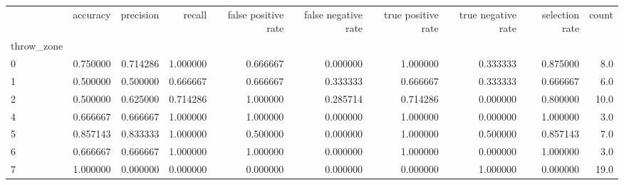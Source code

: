 \begin{tabular}{lrrrrrrrrr}
\toprule
{} &  accuracy &  precision &    recall &  false positive rate &  false negative rate &  true positive rate &  true negative rate &  selection rate &  count \\
throw\_zone &           &            &           &                      &                      &                     &                     &                 &        \\
\midrule
0          &  0.750000 &   0.714286 &  1.000000 &             0.666667 &             0.000000 &            1.000000 &            0.333333 &        0.875000 &    8.0 \\
1          &  0.500000 &   0.500000 &  0.666667 &             0.666667 &             0.333333 &            0.666667 &            0.333333 &        0.666667 &    6.0 \\
2          &  0.500000 &   0.625000 &  0.714286 &             1.000000 &             0.285714 &            0.714286 &            0.000000 &        0.800000 &   10.0 \\
4          &  0.666667 &   0.666667 &  1.000000 &             1.000000 &             0.000000 &            1.000000 &            0.000000 &        1.000000 &    3.0 \\
5          &  0.857143 &   0.833333 &  1.000000 &             0.500000 &             0.000000 &            1.000000 &            0.500000 &        0.857143 &    7.0 \\
6          &  0.666667 &   0.666667 &  1.000000 &             1.000000 &             0.000000 &            1.000000 &            0.000000 &        1.000000 &    3.0 \\
7          &  1.000000 &   0.000000 &  0.000000 &             0.000000 &             0.000000 &            0.000000 &            1.000000 &        0.000000 &   19.0 \\
\bottomrule
\end{tabular}
